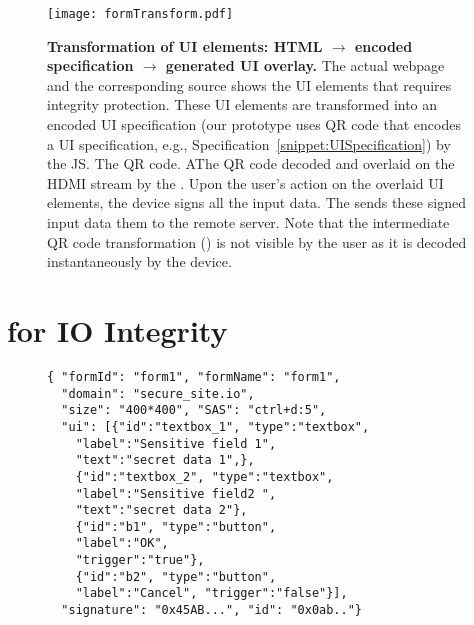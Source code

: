 \begin{figure*}[t]
\centering
\texttt{[image: formTransform.pdf]}
\caption{\textbf{Transformation of UI elements: HTML $\rightarrow$ encoded specification $\rightarrow$ \device generated UI overlay.} \one The actual webpage and the corresponding \html source shows the UI elements that requires integrity protection. \two These UI elements are transformed into an encoded UI specification (our \name prototype uses QR code that encodes a UI specification, e.g., Specification~\ref{snippet:UISpecification}) by the \name JS. The QR code. \three AThe QR code decoded and overlaid on the HDMI stream by the \device. \four Upon the user's action on the overlaid UI elements, the device signs all the input data. \five The \device sends these signed input data them to the remote server. Note that the intermediate QR code transformation (\two) is not visible by the user as it is decoded instantaneously by the device.}
\spacesave
\label{fig:transformation}
\end{figure*}

\section{\name for IO Integrity}
\label{sec:systemDesign}




\begin{figure}[t]
\begin{lstlisting}[mathescape=true]
{ "formId": "form1", "formName": "form1",
  "domain": "secure_site.io",
  "size": "400*400", "SAS": "ctrl+d:5",
  "ui": [{"id":"textbox_1", "type":"textbox", 
  	"label":"Sensitive field 1",
	"text":"secret data 1",},
	{"id":"textbox_2", "type":"textbox",
	"label":"Sensitive field2 ",
	"text":"secret data 2"},
	{"id":"b1", "type":"button",
	"label":"OK",
	"trigger":"true"},	
	{"id":"b2", "type":"button",
	"label":"Cancel", "trigger":"false"}],
  "signature": "0x45AB...", "id": "0x0ab.."}
\end{lstlisting}
\end{figure}

